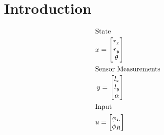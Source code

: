 \documentclass[12pt, letterpaper]{amsart} %
\numberwithin{equation}{section}
\begin{document}
\section{Introduction}
\begin{align*}
  \intertext{State}
  x = 
  \begin{bmatrix}
    r_x \\
    r_y \\
    \theta 
  \end{bmatrix} \\
  \intertext{Sensor Measurements}
  y = 
  \begin{bmatrix}
    l_x \\
    l_y \\
    \alpha
  \end{bmatrix} \\
  \intertext{Input}
  u = 
  \begin{bmatrix}
    \phi_L \\
    \phi_R
  \end{bmatrix} \\  
\end{align*}
\end{document}
